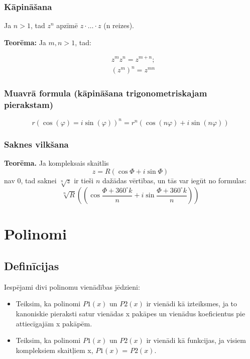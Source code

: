 \documentclass{article}
\begin{document}
\subsubsection{Kāpināšana}

Ja $n>1$, tad $z^n$ apzīmē $z\cdot\ldots\cdot z$ (n reizes).

\textbf{Teorēma:} Ja $m,n>1$, tad:

\begin{align}
	&z^m z^n = z^{m+n}; \\
	&(z^m)^n=z^{mn}
\end{align}


\subsubsection{Muavrā formula (kāpināšana trigonometriskajam pierakstam)}

\begin{equation}
	r(\cos(\varphi) = i\sin(\varphi))^n=r^n(\cos(n\varphi)+i\sin(n\varphi))
\end{equation}

\subsubsection{Saknes vilkšana}

\textbf{Teorēma.} Ja kompleksais skaitlis
\begin{equation}
	z = R(\cos\varPhi + i \sin \varPhi)
\end{equation}
nav 0, tad saknei $\sqrt[n]{z}$ ir tieši $n$ dažādas vērtības, un tās var iegūt no formulas:
\begin{equation}
	\sqrt[n]{R}\left(( \cos \frac{\varPhi + 360^{\circ}k}{n}+ i \sin \frac{\varPhi + 360^{\circ}k}{n})\right)
\end{equation}

\section{Polinomi}

\subsection{Definīcijas}

Iespējami divi polinomu vienādības jēdzieni:
\begin{itemize}
	\item Teiksim, ka polinomi $P1(x)$ un $P2(x)$ ir vienādi kā izteiksmes, ja to kanoniskie pieraksti satur vienādas x pakāpes un vienādus koeficientus pie attiecīgajām x pakāpēm.
	\item Teiksim, ka polinomi $P1(x)$ un $P2(x)$ ir vienādi kā funkcijas, ja visiem kompleksiem skaitļiem x, $P1(x)$ = $P2(x)$.
\end{itemize}
\end{document}

